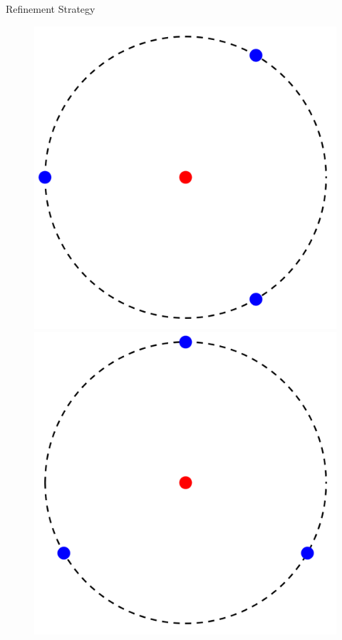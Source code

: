 \documentclass{beamer}
\begin{document}
\begin{frame}{Refinement Strategy}
\begin{itemize}
\begin{enumerate}
\begin{figure}[!htbp]
		  \includegraphics[scale=0.08]{./figures/2D3.png}
		  \includegraphics[scale=0.08]{./figures/2D4.png}

\end{figure}
\end{enumerate}
\end{itemize}
\end{frame}
\end{document}
